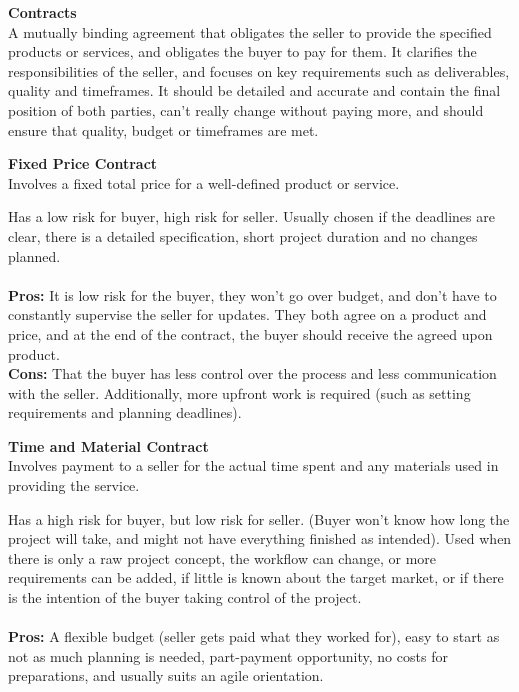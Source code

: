 \documentclass[a4paper,10pt]{article}
\begin{document}
\newpage
\noindent \textcolor{BlueGreen}{\textbf{Contracts}} \\
A mutually binding agreement that obligates the seller to provide the specified products or services, and obligates the buyer to pay for them. It clarifies the responsibilities of the seller, and focuses on key requirements such as deliverables, quality and timeframes. It should be detailed and accurate and contain the final position of both parties, can't really change without paying more, and should ensure that quality, budget or timeframes are met. 
\begin{shaded}
	\noindent \textcolor{BlueGreen}{\textbf{Fixed Price Contract}} \\
	Involves a fixed total price for a well-defined product or service.
\end{shaded}
\noindent Has a low risk for buyer, high risk for seller. Usually chosen if the deadlines are clear, there is a detailed specification, short project duration and no changes planned. \\\\
\textbf{Pros:} It is low risk for the buyer, they won't go over budget, and don't have to constantly supervise the seller for updates. They both agree on a product and price, and at the end of the contract, the buyer should receive the agreed upon product. \\
\textbf{Cons:} That the buyer has less control over the process and less communication with the seller. Additionally, more upfront work is required (such as setting requirements and planning deadlines). 
\begin{shaded}
	\noindent \textcolor{BlueGreen}{\textbf{Time and Material Contract}} \\
	Involves payment to a seller for the actual time spent and any materials used in providing the service. 
\end{shaded}
\noindent 
Has a high risk for buyer, but low risk for seller. (Buyer won't know how long the project will take, and might not have everything finished as intended). Used when there is only a raw project concept, the workflow can change, or more requirements can be added, if little is known about the target market, or if there is the intention of the buyer taking control of the project. \\\\
\textbf{Pros:} A flexible budget (seller gets paid what they worked for), easy to start as not as much planning is needed, part-payment opportunity, no costs for preparations, and usually suits an agile orientation. \\
\end{document}
